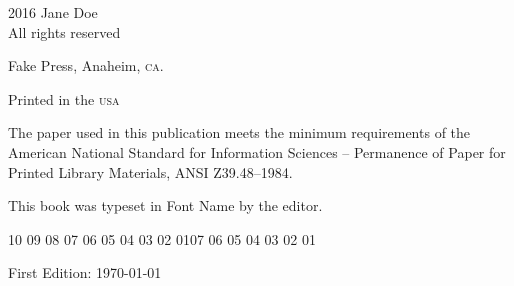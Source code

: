 \newcommand*{\copyrightpage}{\begingroup
    \vspace*{28\baselineskip}
    \footnotesize
    \setlength{\parindent}{0pt}
    \setlength{\parskip}{\baselineskip}
    \textcopyright{} 2016 Jane Doe \\
    All rights reserved

    Fake Press, Anaheim, {\scshape\MakeLowercase{CA}}.

    Printed in the {\scshape\MakeLowercase{USA}}

    The paper used in this publication meets the minimum requirements
    of the American National Standard for Information 
    Sciences -- Permanence of Paper for Printed Library Materials, 
    ANSI Z39.48--1984.
    
    This book was typeset in Font Name by the editor.

    \begin{center}
    10 09 08 07 06 05 04 03 02 01\hspace{2em}07 06 05 04 03 02 01
    \end{center}
    \begin{center}
        First Edition: \today
    \end{center}
    \thispagestyle{empty}
    \clearpage
\endgroup}

\copyrightpage